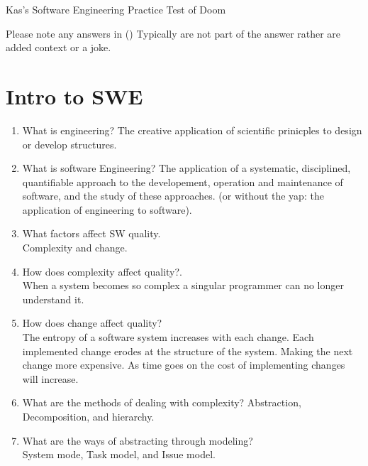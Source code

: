 \documentclass[10pt]{article}
\begin{document}
\begin{center}
      \huge
      Kas's Software Engineering Practice Test of Doom\\

\end{center}
\normalsize
Please note any answers in () Typically are not part of the answer rather are added context or a joke.\\

\section{Intro to SWE}
\begin{enumerate}
      \item What is engineering?
            The creative application of scientific prinicples to design or develop structures.\\

      \item What is software Engineering?
            The application of a systematic, disciplined, quantifiable approach to the developement, operation and maintenance of software, and the study of these approaches.
            (or without the yap: the application of engineering to software).\\

      \item What factors affect SW quality.\\
            Complexity and change.\\

      \item How does complexity affect quality?.\\
            When a system becomes so complex a singular programmer can no longer understand it.\\

      \item How does change affect quality?\\
            The entropy of a software system increases with each change. Each implemented change erodes at the structure of the system. Making the next change more expensive. As time goes on
            the cost of implementing changes will increase.

      \item What are the methods of dealing with complexity?
            Abstraction, Decomposition, and hierarchy.

      \item What are the ways of abstracting through modeling?\\
            System mode, Task model, and Issue model.\\


\end{enumerate}
\end{document}
